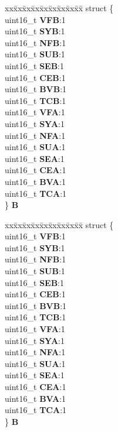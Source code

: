\begin{DoxyCompactItemize}
\begin{tabbing}
\end{tabbing}\item 
\mbox{\label{unionuSSR_a3ec5f092b632c859dc27cb71267f4ed5}} 
\begin{tabbing}
xx\=xx\=xx\=xx\=xx\=xx\=xx\=xx\=xx\=\kill
struct \{\\
\>uint16\_t {\bfseries VFB}:1\\
\>uint16\_t {\bfseries SYB}:1\\
\>uint16\_t {\bfseries NFB}:1\\
\>uint16\_t {\bfseries SUB}:1\\
\>uint16\_t {\bfseries SEB}:1\\
\>uint16\_t {\bfseries CEB}:1\\
\>uint16\_t {\bfseries BVB}:1\\
\>uint16\_t {\bfseries TCB}:1\\
\>uint16\_t {\bfseries VFA}:1\\
\>uint16\_t {\bfseries SYA}:1\\
\>uint16\_t {\bfseries NFA}:1\\
\>uint16\_t {\bfseries SUA}:1\\
\>uint16\_t {\bfseries SEA}:1\\
\>uint16\_t {\bfseries CEA}:1\\
\>uint16\_t {\bfseries BVA}:1\\
\>uint16\_t {\bfseries TCA}:1\\
\} {\bfseries B}\\

\end{tabbing}\item 
\mbox{\label{unionuSSR_a4c8c6845fb4a5815f853b9d3915ac8b8}} 
\begin{tabbing}
xx\=xx\=xx\=xx\=xx\=xx\=xx\=xx\=xx\=\kill
struct \{\\
\>uint16\_t {\bfseries VFB}:1\\
\>uint16\_t {\bfseries SYB}:1\\
\>uint16\_t {\bfseries NFB}:1\\
\>uint16\_t {\bfseries SUB}:1\\
\>uint16\_t {\bfseries SEB}:1\\
\>uint16\_t {\bfseries CEB}:1\\
\>uint16\_t {\bfseries BVB}:1\\
\>uint16\_t {\bfseries TCB}:1\\
\>uint16\_t {\bfseries VFA}:1\\
\>uint16\_t {\bfseries SYA}:1\\
\>uint16\_t {\bfseries NFA}:1\\
\>uint16\_t {\bfseries SUA}:1\\
\>uint16\_t {\bfseries SEA}:1\\
\>uint16\_t {\bfseries CEA}:1\\
\>uint16\_t {\bfseries BVA}:1\\
\>uint16\_t {\bfseries TCA}:1\\
\} {\bfseries B}\\


\end{tabbing}
\end{DoxyCompactItemize}
